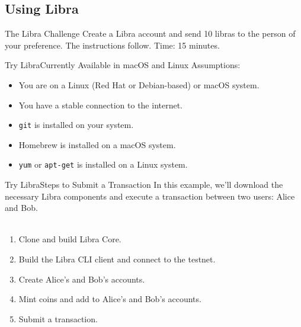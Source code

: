 \begin{darkframes}

\section{Using Libra}
\begin{frame}{The Libra Challenge}
	Create a Libra account and send 10 libras to the person of your preference. The instructions follow.  Time: 15 minutes. 
\end{frame}

\begin{frame}{Try Libra}{Currently Available in macOS and Linux}
	Assumptions:
	\begin{itemize}
	\item You are  on a Linux (Red Hat or Debian-based) or macOS system.
	\item You have a stable connection to the internet.
	\item \texttt{git} is installed on your system.
	\item Homebrew is installed on a macOS system.
	\item \texttt{yum} or \texttt{apt-get} is installed on a Linux system.
	\end{itemize}
\end{frame}

\begin{frame}{Try Libra}{Steps to Submit a Transaction}
	In this example, we'll download the necessary Libra components and execute a transaction between two users: Alice and Bob.\\~\\
	\begin{enumerate}
    	\item Clone and build Libra Core.
    	\item Build the Libra CLI client and connect to the testnet.
    	\item Create Alice’s and Bob’s accounts.
    	\item Mint coins and add to Alice’s and Bob’s accounts.
    	\item Submit a transaction.
	\end{enumerate}
\end{frame}

\end{darkframes}
